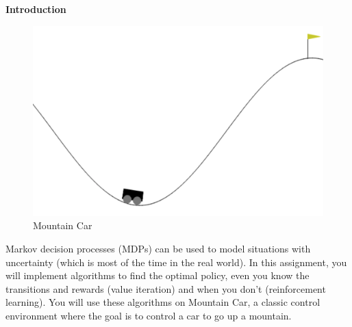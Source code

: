{\bf Introduction}

\begin{figure}
    \includegraphics[width=0.9\linewidth]{mountaincar.png} 
    \caption{Mountain Car}
\end{figure}
    
Markov decision processes (MDPs) can be used to model situations with uncertainty (which is most of the time in the real world). In this assignment, you will implement algorithms to find the optimal policy, even you know the transitions and rewards (value iteration) and when you don't (reinforcement learning). You will use these algorithms on Mountain Car, a classic control environment where the goal is to control a car to go up a mountain.